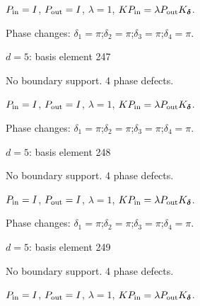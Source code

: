 $P_{\rm in}=I$, \quad $P_{\rm out}=I$, \quad $\lambda=1$, \qquad $K P_{\rm in}=\lambda P_{\rm out}K_{\boldsymbol\delta}$.
\par\smallskip\begin{minipage}{.98\linewidth}\small Phase changes: $\delta_{1}=\pi$;\quad $\delta_{2}=\pi$;\quad $\delta_{3}=\pi$;\quad $\delta_{4}=\pi$.\end{minipage}
\vfill
{\footnotesize\texttt{}}
\newpage
{}
{\Large $d=5$: basis element 247}\par
No boundary support. 4 phase defects.
\begin{center}
\end{center}
\vspace{-1mm}
$P_{\rm in}=I$, \quad $P_{\rm out}=I$, \quad $\lambda=1$, \qquad $K P_{\rm in}=\lambda P_{\rm out}K_{\boldsymbol\delta}$.
\par\smallskip\begin{minipage}{.98\linewidth}\small Phase changes: $\delta_{1}=\pi$;\quad $\delta_{2}=\pi$;\quad $\delta_{3}=\pi$;\quad $\delta_{4}=\pi$.\end{minipage}
\vfill
{\footnotesize\texttt{}}
\newpage
{}
{\Large $d=5$: basis element 248}\par
No boundary support. 4 phase defects.
\begin{center}
\end{center}
\vspace{-1mm}
$P_{\rm in}=I$, \quad $P_{\rm out}=I$, \quad $\lambda=1$, \qquad $K P_{\rm in}=\lambda P_{\rm out}K_{\boldsymbol\delta}$.
\par\smallskip\begin{minipage}{.98\linewidth}\small Phase changes: $\delta_{1}=\pi$;\quad $\delta_{2}=\pi$;\quad $\delta_{3}=\pi$;\quad $\delta_{4}=\pi$.\end{minipage}
\vfill
{\footnotesize\texttt{}}
\newpage
{}
{\Large $d=5$: basis element 249}\par
No boundary support. 4 phase defects.
\begin{center}
\end{center}
\vspace{-1mm}
$P_{\rm in}=I$, \quad $P_{\rm out}=I$, \quad $\lambda=1$, \qquad $K P_{\rm in}=\lambda P_{\rm out}K_{\boldsymbol\delta}$.
